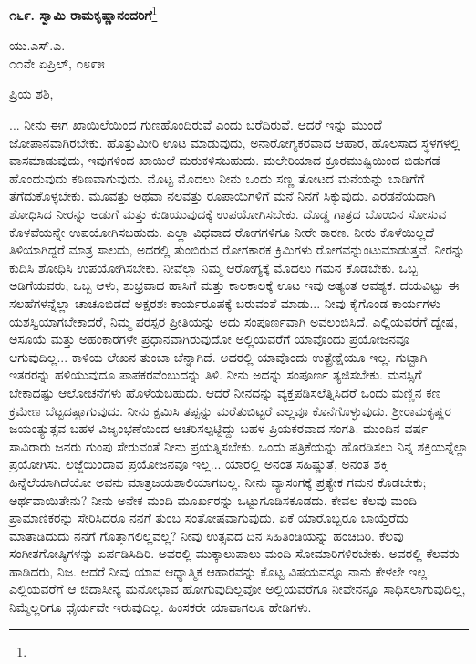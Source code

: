 \newpage

\begin{center}
\textbf{೧೬೯. ಸ್ವಾಮಿ ರಾಮಕೃಷ್ಣಾನಂದರಿಗೆ}\footnote{}
\end{center}

\vspace{-0.8cm}

\begin{flushright}
ಯು.ಎಸ್.ಎ.\\೧೧ನೇ ಏಪ್ರಿಲ್, ೧೮೯೫
\end{flushright}

\vspace{-0.5cm}

\noindent
ಪ್ರಿಯ ಶಶಿ,

... ನೀನು ಈಗ ಖಾಯಿಲೆಯಿಂದ ಗುಣಹೊಂದಿರುವೆ ಎಂದು ಬರೆದಿರುವೆ. ಆದರೆ ಇನ್ನು ಮುಂದೆ ಜೋಪಾನವಾಗಿರಬೇಕು. ಹೊತ್ತುಮೀರಿ ಊಟ ಮಾಡುವುದು, ಅನಾರೋಗ್ಯಕರವಾದ ಆಹಾರ, ಹೊಲಸಾದ ಸ್ಥಳಗಳಲ್ಲಿ ವಾಸಮಾಡುವುದು, ಇವುಗಳಿಂದ ಖಾಯಿಲೆ ಮರುಕಳಿಸಬಹುದು. ಮಲೇರಿಯಾದ ಕ್ರೂರಮುಷ್ಟಿಯಿಂದ ಬಿಡುಗಡೆ ಹೊಂದುವುದು ಕಠಿಣವಾಗುವುದು. ಮೊಟ್ಟ ಮೊದಲು ನೀನು ಒಂದು ಸಣ್ಣ ತೋಟದ ಮನೆಯನ್ನು ಬಾಡಿಗೆಗೆ ತೆಗೆದುಕೊಳ್ಳಬೇಕು. ಮೂವತ್ತು ಅಥವಾ ನಲವತ್ತು ರೂಪಾಯಿಗಳಿಗೆ ಮನೆ ನಿನಗೆ ಸಿಕ್ಕುವುದು. ಎರಡನೆಯದಾಗಿ ಶೋಧಿಸಿದ ನೀರನ್ನು ಅಡುಗೆ ಮತ್ತು ಕುಡಿಯುವುದಕ್ಕೆ ಉಪಯೋಗಿಸಬೇಕು. ದೊಡ್ಡ ಗಾತ್ರದ ಬೊಂಬಿನ ಸೋಸುವ ಕೊಳವೆಯನ್ನೇ ಉಪಯೋಗಿಸಬಹುದು. ಎಲ್ಲಾ ವಿಧವಾದ ರೋಗಗಳಿಗೂ ನೀರೇ ಕಾರಣ. ನೀರು ಕೊಳೆಯಿಲ್ಲದೆ ತಿಳಿಯಾಗಿದ್ದರೆ ಮಾತ್ರ ಸಾಲದು, ಅದರಲ್ಲಿ ತುಂಬಿರುವ ರೋಗಕಾರಕ ಕ್ರಿಮಿಗಳು ರೋಗವನ್ನುಂಟುಮಾಡುತ್ತವೆ. ನೀರನ್ನು ಕುದಿಸಿ ಶೋಧಿಸಿ ಉಪಯೋಗಿಸಬೇಕು. ನೀವೆಲ್ಲಾ ನಿಮ್ಮ ಆರೋಗ್ಯಕ್ಕೆ ಮೊದಲು ಗಮನ ಕೊಡಬೇಕು. ಒಬ್ಬ ಅಡಿಗೆಯವರು, ಒಬ್ಬ ಆಳು, ಶುಭ್ರವಾದ ಹಾಸಿಗೆ ಮತ್ತು ಕಾಲಕಾಲಕ್ಕೆ ಊಟ ಇವು ಅತ್ಯಂತ ಆವಶ್ಯಕ. ದಯವಿಟ್ಟು ಈ ಸಲಹೆಗಳನ್ನೆಲ್ಲಾ ಚಾಚೂಬಿಡದೆ ಅಕ್ಷರಶಃ ಕಾರ್ಯರೂಪಕ್ಕೆ ಬರುವಂತೆ ಮಾಡು... ನೀವು ಕೈಗೊಂಡ ಕಾರ್ಯಗಳು ಯಶಸ್ವಿಯಾಗಬೇಕಾದರೆ, ನಿಮ್ಮ ಪರಸ್ಪರ ಪ್ರೀತಿಯನ್ನು ಅದು ಸಂಪೂರ್ಣವಾಗಿ ಅವಲಂಬಿಸಿದೆ. ಎಲ್ಲಿಯವರೆಗೆ ದ್ವೇಷ, ಅಸೂಯೆ ಮತ್ತು ಅಹಂಕಾರಗಳೇ ಪ್ರಧಾನವಾಗಿರುವುದೋ ಅಲ್ಲಿಯವರೆಗೆ ಯಾವೊಂದು ಪ್ರಯೋಜನವೂ ಆಗುವುದಿಲ್ಲ... ಕಾಳಿಯ ಲೇಖನ ತುಂಬಾ ಚೆನ್ನಾಗಿದೆ. ಅದರಲ್ಲಿ ಯಾವೊಂದು ಉತ್ಪ್ರೇಕ್ಷೆಯೂ ಇಲ್ಲ. ಗುಟ್ಟಾಗಿ ಇತರರನ್ನು ಹಳಿಯುವುದೂ ಪಾಪಕರವೆಂಬುದನ್ನು ತಿಳಿ. ನೀನು ಅದನ್ನು ಸಂಪೂರ್ಣ ತ್ಯಜಿಸಬೇಕು. ಮನಸ್ಸಿಗೆ ಬೇಕಾದಷ್ಟು ಆಲೋಚನೆಗಳು ಹೊಳೆಯಬಹುದು. ಆದರೆ ನೀನದನ್ನು ವ್ಯಕ್ತಪಡಿಸಲೆತ್ನಿಸಿದರೆ ಒಂದು ಮಣ್ಣಿನ ಕಣ ಕ್ರಮೇಣ ಬೆಟ್ಟದಷ್ಟಾಗುವುದು. ನೀನು ಕ್ಷಮಿಸಿ ತಪ್ಪನ್ನು ಮರೆತುಬಿಟ್ಟರೆ ಎಲ್ಲವೂ ಕೊನೆಗೊಳ್ಳುವುದು. ಶ‍್ರೀರಾಮಕೃಷ್ಣರ ಜಯಂತ್ಯುತ್ಸವ ಬಹಳ ವಿಜೃಂಭಣೆಯಿಂದ ಆಚರಿಸಲ್ಪಟ್ಟಿದ್ದು ಬಹಳ ಪ್ರಿಯಕರವಾದ ಸಂಗತಿ. ಮುಂದಿನ ವರ್ಷ ಸಾವಿರಾರು ಜನರು ಗುಂಪು ಸೇರುವಂತೆ ನೀನು ಪ್ರಯತ್ನಿಸಬೇಕು. ಒಂದು ಪತ್ರಿಕೆಯನ್ನು ಹೊರಡಿಸಲು ನಿನ್ನ ಶಕ್ತಿಯನ್ನೆಲ್ಲಾ ಪ್ರಯೋಗಿಸು. ಲಜ್ಜೆಯಿಂದಾವ ಪ್ರಯೋಜನವೂ ಇಲ್ಲ... ಯಾರಲ್ಲಿ ಅನಂತ ಸಹಿಷ್ಣುತೆ, ಅನಂತ ಶಕ್ತಿ ಹಿನ್ನೆಲೆಯಾಗಿದೆಯೋ ಅವನು ಮಾತ್ರ\break ಜಯಶಾಲಿಯಾಗಬಲ್ಲ. ನೀನು ವ್ಯಾಸಂಗಕ್ಕೆ ಪ್ರತ್ಯೇಕ ಗಮನ ಕೊಡಬೇಕು; ಅರ್ಥವಾಯಿ\break ತೇನು? ನೀನು ಅನೇಕ ಮಂದಿ ಮೂರ್ಖರನ್ನು ಒಟ್ಟುಗೂಡಿಸಕೂಡದು. ಕೇವಲ ಕೆಲವು ಮಂದಿ ಪ್ರಾಮಾಣಿಕರನ್ನು ಸೇರಿಸಿದರೂ ನನಗೆ ತುಂಬ ಸಂತೋಷವಾಗುವುದು. ಏಕೆ ಯಾರೊಬ್ಬರೂ ಬಾಯ್ತೆರೆದು ಮಾತಾಡಿದುದು ನನಗೆ ಗೊತ್ತಾಗಲಿಲ್ಲವಲ್ಲ? ನೀವು ಉತ್ಸವದ ದಿನ ಸಿಹಿತಿಂಡಿಯನ್ನು ಹಂಚಿದಿರಿ. ಕೆಲವು ಸಂಗೀತಗೋಷ್ಠಿಗಳನ್ನು ಏರ್ಪಡಿಸಿದಿರಿ. ಅವರಲ್ಲಿ ಮುಕ್ಕಾಲುಪಾಲು ಮಂದಿ ಸೋಮಾರಿಗಳಿರಬೇಕು. ಅವರಲ್ಲಿ ಕೆಲವರು ಹಾಡಿದರು, ನಿಜ. ಆದರೆ ನೀವು ಯಾವ ಆಧ್ಯಾತ್ಮಿಕ ಆಹಾರವನ್ನು ಕೊಟ್ಟ ವಿಷಯವನ್ನೂ ನಾನು ಕೇಳಲೇ ಇಲ್ಲ. ಎಲ್ಲಿಯವರೆಗೆ ಆ ಔದಾಸೀನ್ಯ ಮನೋಭಾವ ಹೋಗುವುದಿಲ್ಲವೋ ಅಲ್ಲಿಯವರೆಗೂ ನೀವೇನನ್ನೂ ಸಾಧಿಸಲಾಗುವುದಿಲ್ಲ, ನಿಮ್ಮೆಲ್ಲರಿಗೂ ಧೈರ್ಯವೇ ಇರುವುದಿಲ್ಲ. ಹಿಂಸಕರೇ ಯಾವಾಗಲೂ ಹೇಡಿಗಳು.


